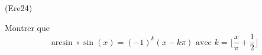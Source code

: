 \begin{tiny}(Ere24)\end{tiny} Montrer que
\begin{displaymath}
  \arcsin \circ \sin (x) = (-1)^k (x-k\pi)\text{ avec } k =\lfloor \frac{x}{\pi} +\frac{1}{2}\rfloor
\end{displaymath}
